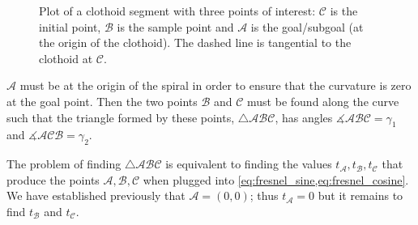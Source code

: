 \begin{figure}
    \caption{Plot of a clothoid segment with three points of interest: $\mathcal{C}$ is the initial point, $\mathcal{B}$ is the sample point and $\mathcal{A}$ is the goal/subgoal (at the origin of the clothoid). The dashed line is tangential to the clothoid at $\mathcal{C}$.}
    \label{fig:clothoid_segment}
\end{figure}
$\mathcal{A}$ must be at the origin of the spiral in order to ensure that the curvature is zero at the goal point.
Then the two points $\mathcal{B}$ and $\mathcal{C}$ must be found along the curve such that the triangle formed by these points, $\triangle{\mathcal{ABC}}$, has angles $\measuredangle{\mathcal{ABC}}=\gamma_1$ and $\measuredangle{\mathcal{ACB}}=\gamma_2$.

The problem of finding $\triangle{\mathcal{ABC}}$ is equivalent to finding the values $t_\mathcal{A},t_\mathcal{B},t_\mathcal{C}$ that produce the points $\mathcal{A},\mathcal{B},\mathcal{C}$ when plugged into \ref{eq:fresnel_sine,eq:fresnel_cosine}. 
We have established previously that $\mathcal{A} = (0, 0)$; thus $t_\mathcal{A}=0$ but it remains to find $t_\mathcal{B}$ and $t_\mathcal{C}$.

